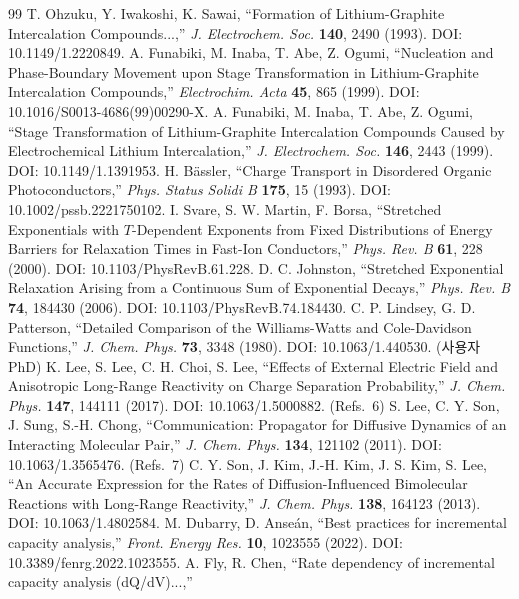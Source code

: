 \begin{thebibliography}{99}
 T. Ohzuku, Y. Iwakoshi, K. Sawai, ``Formation of Lithium-Graphite Intercalation
  Compounds...,'' \emph{J. Electrochem. Soc.} \textbf{140}, 2490 (1993). DOI: 10.1149/1.2220849.
 A. Funabiki, M. Inaba, T. Abe, Z. Ogumi, ``Nucleation and Phase-Boundary
  Movement upon Stage Transformation in Lithium-Graphite Intercalation Compounds,''
  \emph{Electrochim. Acta} \textbf{45}, 865 (1999). DOI: 10.1016/S0013-4686(99)00290-X.
 A. Funabiki, M. Inaba, T. Abe, Z. Ogumi, ``Stage Transformation of
  Lithium-Graphite Intercalation Compounds Caused by Electrochemical Lithium Intercalation,''
  \emph{J. Electrochem. Soc.} \textbf{146}, 2443 (1999). DOI: 10.1149/1.1391953.
 H. B\"assler, ``Charge Transport in Disordered Organic Photoconductors,''
  \emph{Phys. Status Solidi B} \textbf{175}, 15 (1993). DOI: 10.1002/pssb.2221750102.
 I. Svare, S. W. Martin, F. Borsa, ``Stretched Exponentials with $T$-Dependent
  Exponents from Fixed Distributions of Energy Barriers for Relaxation Times in Fast-Ion Conductors,''
  \emph{Phys. Rev. B} \textbf{61}, 228 (2000). DOI: 10.1103/PhysRevB.61.228.
 D. C. Johnston, ``Stretched Exponential Relaxation Arising from a Continuous Sum
  of Exponential Decays,'' \emph{Phys. Rev. B} \textbf{74}, 184430 (2006). DOI: 10.1103/PhysRevB.74.184430.
 C. P. Lindsey, G. D. Patterson, ``Detailed Comparison of the Williams-Watts and
  Cole-Davidson Functions,'' \emph{J. Chem. Phys.} \textbf{73}, 3348 (1980). DOI: 10.1063/1.440530.
 (사용자 PhD) K. Lee, S. Lee, C. H. Choi, S. Lee, ``Effects of External Electric Field and Anisotropic Long-Range Reactivity on Charge Separation Probability,''
  \emph{J. Chem. Phys.} \textbf{147}, 144111 (2017). DOI: 10.1063/1.5000882.
 (Refs.~6) S. Lee, C. Y. Son, J. Sung, S.-H. Chong, ``Communication: Propagator for Diffusive Dynamics of an Interacting Molecular Pair,''
  \emph{J. Chem. Phys.} \textbf{134}, 121102 (2011). DOI: 10.1063/1.3565476.
 (Refs.~7) C. Y. Son, J. Kim, J.-H. Kim, J. S. Kim, S. Lee, ``An Accurate Expression for the Rates of Diffusion-Influenced Bimolecular Reactions with Long-Range Reactivity,''
  \emph{J. Chem. Phys.} \textbf{138}, 164123 (2013). DOI: 10.1063/1.4802584.
 M. Dubarry, D. Anseán, ``Best practices for incremental capacity analysis,''
  \emph{Front. Energy Res.} \textbf{10}, 1023555 (2022). DOI: 10.3389/fenrg.2022.1023555.
 A. Fly, R. Chen, ``Rate dependency of incremental capacity analysis (dQ/dV)...,''

\end{thebibliography}
